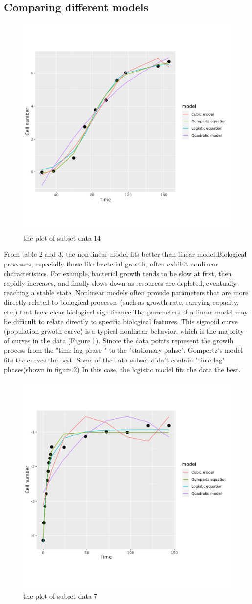 \documentclass[11pt]{article}
\begin{document}
\subsection{Comparing different models}
\begin{figure}
    \centering
    \includegraphics[width=0.5\linewidth]{../results/subset_ 14 _plot.png}
    \caption{the plot of subset data 14}
    \label{fig:subset1-plot14}
\end{figure}

From table 2 and 3, the non-linear model fits better than linear model.Biological processes, especially those like bacterial growth, often exhibit nonlinear characteristics. For example, bacterial growth tends to be slow at first, then rapidly increases, and finally slows down as resources are depleted, eventually reaching a stable state. Nonlinear models often provide parameters that are more directly related to biological processes\cite{zwietering1990} (such as growth rate, carrying capacity, etc.) that have clear biological significance.The parameters of a linear model may be difficult to relate directly to specific biological features.
This sigmoid curve (population grwoth curve) is a typical nonlinear behavior, which is the majority of curves in the data (Figure 1).  Sincce the data points represent the growth process from the "time-lag phase " to the "stationary pahse". Gompertz's model fits the curves the best. 
Some of the data subset didn't contain "time-lag" phases(shown in figure.2) In this case, the logistic model fits the data the best.
\begin{figure}
        \centering
        \includegraphics[width=0.5\linewidth]{../results/subset_ 7 _plot.png}
        \caption{the plot of subset data 7 }
        \label{fig:subset1-plot7}
    \end{figure}
\end{document}

